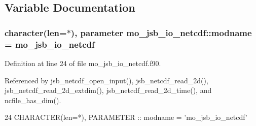 \subsection{Variable Documentation}
\hypertarget{namespacemo__jsb__io__netcdf_a9e42139581fe6002bdbc58266020b84a}{}
\subsubsection[{modname}]{\setlength{\rightskip}{0pt plus 5cm}character(len=$\ast$), parameter mo\+\_\+jsb\+\_\+io\+\_\+netcdf\+::modname = \textquotesingle{}mo\+\_\+jsb\+\_\+io\+\_\+netcdf\textquotesingle{}}\label{namespacemo__jsb__io__netcdf_a9e42139581fe6002bdbc58266020b84a}


Definition at line 24 of file mo\+\_\+jsb\+\_\+io\+\_\+netcdf.\+f90.



Referenced by jsb\+\_\+netcdf\+\_\+open\+\_\+input(), jsb\+\_\+netcdf\+\_\+read\+\_\+2d(), jsb\+\_\+netcdf\+\_\+read\+\_\+2d\+\_\+extdim(), jsb\+\_\+netcdf\+\_\+read\+\_\+2d\+\_\+time(), and ncfile\+\_\+has\+\_\+dim().


\begin{DoxyCode}
24   \textcolor{keywordtype}{CHARACTER(len=*)}, \textcolor{keywordtype}{PARAMETER} :: modname = \textcolor{stringliteral}{'mo\_jsb\_io\_netcdf'}
\end{DoxyCode}
